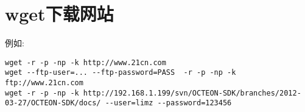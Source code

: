 \section{wget下载网站}
例如:
\begin{lstlisting}
wget -r -p -np -k http://www.21cn.com
wget --ftp-user=... --ftp-password=PASS  -r -p -np -k ftp://www.21cn.com
wget -r -p -np -k http://192.168.1.199/svn/OCTEON-SDK/branches/2012-03-27/OCTEON-SDK/docs/ --user=limz --password=123456
\end{lstlisting}



